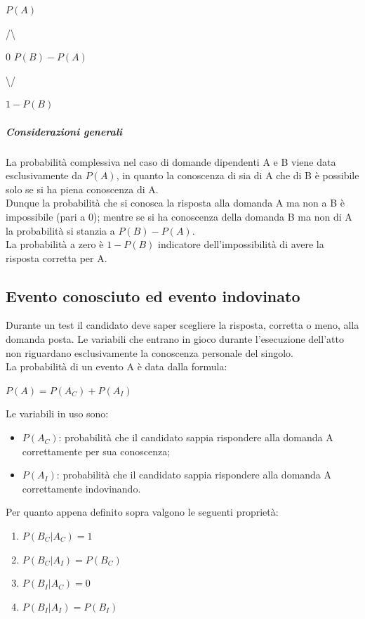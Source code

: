 \begin{center} $P(A)$ \end{center}
\begin{center} /\textbackslash \end{center}
\begin{center} 0  $P(B)-P(A)$ \end{center}
\begin{center} \textbackslash / \end{center}
\begin{center} $1-P(B)$ \end{center}
\noindent
\subparagraph{Considerazioni generali}
\label{Considerazioni generali A implica B}
\noindent
 La probabilit\`a complessiva nel caso di domande dipendenti A e B viene data esclusivamente da $P(A)$, in quanto la conoscenza di sia di A che di B \`e  possibile solo se si ha piena conoscenza di A.\\  Dunque la probabilit\`a  che si conosca la risposta alla domanda  A ma non a B  \`e impossibile (pari a 0); mentre se si ha conoscenza della domanda B ma non di A la probabilit\`a si stanzia a $P(B)-P(A)$.\\ 
La probabilit\`a a zero \`e $1-P(B)$ indicatore dell'impossibilit\`a  di avere la risposta corretta per A.

\subsection{Evento conosciuto ed evento indovinato}
\label{Evento conosciuto ed evento indovinato}
Durante un test il candidato deve saper scegliere la risposta, corretta o meno, alla domanda posta. Le variabili che entrano in gioco durante l'esecuzione dell'atto non riguardano esclusivamente la conoscenza personale del singolo.
\\
La probabilit\`a di un evento A \`e data dalla formula:
\begin{center} $P(A)=P(A_{C})+P(A_{I})$\end{center} 
Le variabili in uso sono:
\begin{itemize}
\item $P(A_{C})$: probabilit\`a che il candidato sappia rispondere alla domanda A correttamente per sua conoscenza;
\item $P(A_{I})$: probabilit\`a che il candidato sappia rispondere alla domanda A correttamente indovinando.
\end{itemize}

\noindent
Per quanto appena definito sopra valgono le seguenti propriet\`a:
\begin{enumerate}
\item $P(B_{C}|A_{C})=1$

\item $P(B_{C}|A_{I})=P(B_{C})$ 

\item $P(B_{I}|A_{C})=0$

\item $P(B_{I}|A_{I})=P(B_{I})$ 
\end{enumerate}
\noindent

